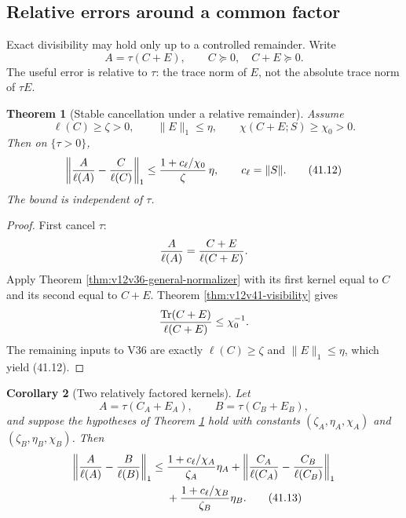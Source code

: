 \documentclass[11pt]{article}
\newtheorem{theorem}{Theorem}[section]
\newtheorem{corollary}[theorem]{Corollary}
\theoremstyle{remark}
\begin{document}
\subsection{Relative errors around a common factor}

Exact divisibility may hold only up to a controlled remainder.
Write
\begin{equation}
 A=\tau(C+E),\qquad C\succeq0,\quad C+E\succeq0.  \tag{41.10}
\end{equation}
The useful error is relative to \(\tau\): the trace norm of \(E\),
not the absolute trace norm of \(\tau E\).

\begin{theorem}[Stable cancellation under a relative remainder]
\label{thm:v12v41-relative}
Assume
\begin{equation}
 \ell(C)\geq\zeta>0,\qquad
 \|E\|_1\leq\eta,\qquad
 \chi(C+E;S)\geq\chi_0>0.                         \tag{41.11}
\end{equation}
Then on \(\{\tau>0\}\),
\begin{equation}
 \left\|
 {A\over\ell(A)}
 -
 {C\over\ell(C)}
 \right\|_1
 \leq
 {1+c_\ell/\chi_0\over\zeta}\,\eta,
 \qquad c_\ell=\|S\|.                             \tag{41.12}
\end{equation}
The bound is independent of \(\tau\).
\end{theorem}

\begin{proof}
First cancel \(\tau\):
\[
 {A\over\ell(A)}
 =
 {C+E\over\ell(C+E)}.
\]
Apply Theorem \ref{thm:v12v36-general-normalizer} with its first
kernel equal to \(C\) and its second equal to \(C+E\).
Theorem \ref{thm:v12v41-visibility} gives
\[
 {\operatorname{Tr}(C+E)\over\ell(C+E)}
 \leq\chi_0^{-1}.
\]
The remaining inputs to V36 are exactly
\(\ell(C)\geq\zeta\) and \(\|E\|_1\leq\eta\), which yield
(41.12).
\end{proof}

\begin{corollary}[Two relatively factored kernels]
\label{cor:v12v41-two-factor}
Let
\[
 A=\tau(C_A+E_A),\qquad
 B=\tau(C_B+E_B),
\]
and suppose the hypotheses of Theorem
\ref{thm:v12v41-relative} hold with constants
\((\zeta_A,\eta_A,\chi_A)\) and
\((\zeta_B,\eta_B,\chi_B)\).  Then
\begin{align}
 \left\|
 {A\over\ell(A)}-{B\over\ell(B)}
 \right\|_1
 \leq{}&
 {1+c_\ell/\chi_A\over\zeta_A}\eta_A
 +
 \left\|
 {C_A\over\ell(C_A)}-{C_B\over\ell(C_B)}
 \right\|_1
 \nonumber\\
 &+
 {1+c_\ell/\chi_B\over\zeta_B}\eta_B.            \tag{41.13}
\end{align}
\end{corollary}
\end{document}
